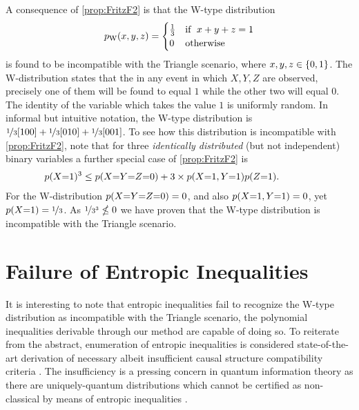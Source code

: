 A consequence of \cref{prop:FritzF2} is that the W-type distribution
\begin{align}\label{eq:wdistribution}
p_{\text{W}}\lparen x,y,z\rparen=\begin{cases}\tfrac{1}{3}&\text{if }\; x+y+z=1 \\ 0&\text{otherwise}\end{cases}
\end{align}
is found to be incompatible with the Triangle scenario, where $x,y,z\in\left\lbrace0,1\right\rbrace$. The W-distribution states that the in any event in which $X,Y,Z$ are observed, precisely one of them will be found to equal $1$ while the other two will equal $0$. The identity of the variable which takes the value $1$ is uniformly random. In informal but intuitive notation, the W-type distribution is ${\nicefrac{1}{3}[100]+\nicefrac{1}{3}[010]+\nicefrac{1}{3}[001]}$.
To see how this distribution is incompatible with \cref{prop:FritzF2}, note that for three \emph{identically distributed} (but not independent) binary variables a further special case of \cref{prop:FritzF2} is
\begin{align*}\begin{split}
&\hspace{-6ex}\p{X\cramp{=}1}^3\leq \p{X\cramp{=}Y\cramp{=}Z\cramp{=}0} + 3\times\p{X\cramp{=}1,Y\cramp{=}1}\p{Z\cramp{=}1}.
\end{split}\end{align*}
For the W-distribution ${p\lparen X\mathord{=}Y\mathord{=}Z\mathord{=}0\rparen=0}$, and also ${p\lparen X\mathord{=}1,Y\mathord{=}1\rparen=0}$, yet ${p\lparen X\mathord{=}1\rparen=\nicefrac{1}{3}}$. As ${\nicefrac{1}{3^3}\nleq 0}$ we have proven that the W-type distribution is incompatible with the Triangle scenario. 


\section{Failure of Entropic Inequalities}

It is interesting to note that entropic inequalities \cite{fritz2013marginal,chaves2014novel} fail to recognize the W-type distribution as incompatible with the Triangle scenario, the polynomial inequalities derivable through our method are capable of doing so. To reiterate from the abstract, enumeration of entropic inequalities is considered state-of-the-art derivation of necessary albeit insufficient causal structure compatibility criteria \cite{pusey2014gdag}. The insufficiency is a pressing concern in quantum information theory as there are uniquely-quantum distributions which cannot be certified as non-classical by means of entropic inequalities \cite{fritz2012bell}. 

